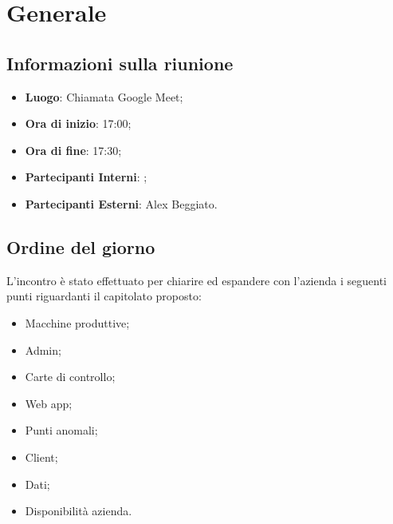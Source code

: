 \section{Generale}

\vspace{10pt}

\subsection{Informazioni sulla riunione}
\begin{itemize}
	\item \textbf{Luogo}: Chiamata Google Meet;
	\item \textbf{Ora di inizio}: 17:00;
	\item \textbf{Ora di fine}: 17:30;
	\item \textbf{Partecipanti Interni}: \team;
	\item \textbf{Partecipanti Esterni}: Alex Beggiato.
\end{itemize}

\vspace{5pt}

\subsection{Ordine del giorno}
L'incontro è stato effettuato per chiarire ed espandere con l'azienda i seguenti punti riguardanti il capitolato proposto:
\begin{itemize}
        \item Macchine produttive;
        \item Admin;
        \item Carte di controllo;
        \item Web app;
        \item Punti anomali;
        \item Client;
        \item Dati;
        \item Disponibilità azienda.
    \end{itemize}
